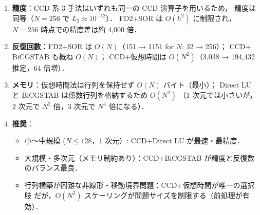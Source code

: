 \begin{enumerate}
  \item \textbf{精度}：CCD 系 3 手法はいずれも同一の CCD 演算子を用いるため，
        精度は同等（$N=256$ で $L_2 \approx 10^{-12}$）．
        FD2$+$SOR は $O(h^2)$ に制限され，$N=256$ 時点での精度差は約 4,000 倍．

  \item \textbf{反復回数}：FD2$+$SOR は $O(N)$（151 → 1151 for $N$: 32 → 256）；
        CCD$+$BiCGSTAB も概ね $O(N)$；
        CCD$+$仮想時間は $O(N^2)$（3,038 → 194,432 推定，64 倍増）．

  \item \textbf{メモリ}：仮想時間法は行列を保持せず $O(N)$ バイト（最小）；
        Direct LU と BiCGSTAB は係数行列を格納するため $O(N^2)$
        （1 次元では小さいが，2 次元で $N^2$ 倍，3 次元で $N^4$ 倍になる）．

  \item \textbf{推奨}：
        \begin{itemize}
          \item 小〜中規模 ($N \leq 128$，1 次元）: CCD$+$Direct LU が最速・最精度．
          \item 大規模・多次元（メモリ制約あり）：CCD$+$BiCGSTAB が精度と反復数のバランス最良．
          \item 行列構築が困難な非線形・移動境界問題：CCD$+$仮想時間が唯一の選択肢
                だが，$O(N^2)$ スケーリングが問題サイズを制限する（前処理が有効）．
        \end{itemize}
\end{enumerate}
